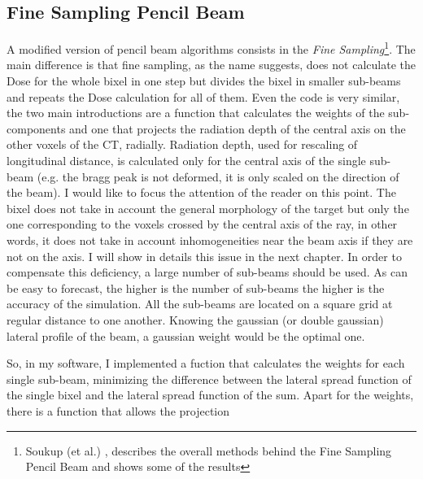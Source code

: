 \documentclass[12pt, a4paper, twoside]{book}
\begin{document}
\subsection{Fine Sampling Pencil Beam}
A modified version of pencil beam algorithms consists in the \emph{Fine Sampling}\footnote{Soukup (et al.) \cite{souk:pba}, describes the overall methods behind the Fine Sampling Pencil Beam and shows some of the results}.
The main difference is that fine sampling, as the name suggests, does not calculate the Dose for the whole bixel in one step but divides the bixel in smaller sub-beams and repeats the Dose calculation for all of them. 
Even the code is very similar, the two main introductions are a function that calculates the weights of the sub-components and one that projects the radiation depth of the central axis on the other voxels of the CT, radially.
Radiation depth, used for rescaling of longitudinal distance, is calculated only for the central axis of the single sub-beam (e.g. the bragg peak is not deformed, it is only scaled on the direction of the beam). I would like to focus the attention of the reader on this point. The bixel does not take in account the general morphology of the target but only the one corresponding to the voxels crossed by the central axis of the ray, in other words, it does not take in account inhomogeneities near the beam axis if they are not on the axis. I will show in details this issue in the next chapter. 
In order to compensate this deficiency, a large number of sub-beams should be used. 
As can be easy to forecast, the higher is the number of sub-beams the higher is the accuracy of the simulation. All the sub-beams are located on a square grid at regular distance to one another. Knowing the gaussian (or double gaussian) lateral profile of the beam, a gaussian weight would be the optimal one.

So, in my software, I implemented a fuction that calculates the weights for each single sub-beam, minimizing the difference between the lateral spread function of the single bixel and the lateral spread function of the sum.
Apart for the weights, there is a function that allows the projection 
\end{document}
